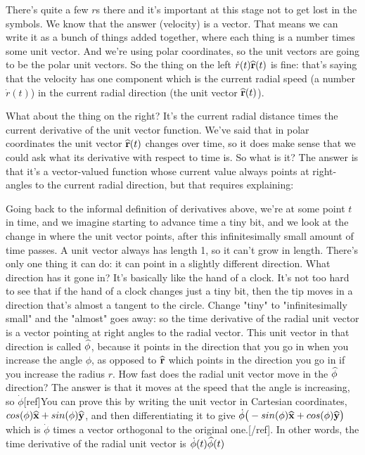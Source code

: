 There's quite a few $r$s there and it's important at this stage not to get lost
in the symbols. We know that the answer (velocity) is a vector. That means we
can write it as a bunch of things added together, where each thing is a number
times some unit vector. And we're using polar coordinates, so the unit vectors
are going to be the polar unit vectors. So the thing on the left $\dot r(t)
\mathbf{\widehat{r}}(t)$ is fine: that's saying that the velocity has one component which is
the current radial speed (a number $\dot r(t)$) in the current radial direction
(the unit vector $\mathbf{\widehat{r}}(t)$).

What about the thing on the right? It's the current radial distance times the
current derivative of the unit vector function. We've said that in polar
coordinates the unit vector $\mathbf{\widehat{r}}(t)$ changes over time, so it does make sense
that we could ask what its derivative with respect to time is. So what is it?
The answer is that it's a vector-valued function whose current value always
points at right-angles to the current radial direction, but that requires
explaining:

Going back to the informal definition of derivatives above, we're at some point
$t$ in time, and we imagine starting to advance time a tiny bit, and we look at
the change in where the unit vector points, after this infinitesimally small
amount of time passes. A unit vector always has length 1, so it can't grow in
length. There's only one thing it can do: it can point in a slightly different
direction. What direction has it gone in? It's basically like the hand of a
clock. It's not too hard to see that if the hand of a clock changes just a tiny
bit, then the tip moves in a direction that's almost a tangent to the
circle. Change "tiny" to "infinitesimally small" and the "almost" goes away: so
the time derivative of the radial unit vector is a vector pointing at right
angles to the radial vector. This unit vector in that direction is called
$\mathbf{\widehat{\phi}}$, because it points in the direction that you go in when you increase
the angle $\phi$, as opposed to $\mathbf{\widehat{r}}$ which points in the direction you go in
if you increase the radius $r$. How fast does the radial unit vector move in
the $\mathbf{\widehat{\phi}}$ direction? The answer is that it moves at the speed that the
angle is increasing, so $\dot \phi$[ref]You can prove this by writing the unit
vector in Cartesian coordinates, $cos(\phi) \mathbf{\widehat{x}} + sin(\phi) \mathbf{\widehat{y}}$, and then
differentiating it to give $\dot \phi\big(-sin(\phi)\mathbf{\widehat{x}} +
cos(\phi)\mathbf{\widehat{y}}\big)$ which is $\dot \phi$ times a vector orthogonal to the
original one.[/ref]. In other words, the time derivative of the radial unit
vector is $\dot \phi(t) \mathbf{\widehat{\phi}}(t)$

